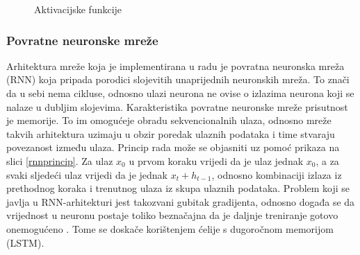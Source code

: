 \documentclass[times, utf8, zavrsni]{fer}
\begin{document}
\begin{figure}
     \centering
     \caption{Aktivacijske funkcije}
     \label{aktivacijske}
\end{figure}

\subsubsection{Povratne neuronske mreže}
Arhitektura mreže koja je implementirana u radu je povratna neuronska mreža (\gls{RNN}) koja pripada porodici slojevitih unaprijednih neuronskih mreža. To znači da u sebi nema cikluse, odnosno ulazi neurona ne ovise o izlazima neurona koji se nalaze u dubljim slojevima. Karakteristika povratne neuronske mreže prisutnost je memorije. To im omogućeje obradu sekvencionalnih ulaza, odnosno mreže takvih arhitektura uzimaju u obzir poredak ulaznih podataka i time stvaraju povezanost između ulaza. Princip rada može se objasniti uz pomoć prikaza na slici \ref{rnnprincip}. Za ulaz $x_0$ u prvom koraku vrijedi da je ulaz jednak $x_0$, a za svaki sljedeći ulaz vrijedi da je jednak $x_{t} + h_{t-1}$, odnosno kombinaciji izlaza iz prethodnog koraka i trenutnog ulaza iz skupa ulaznih podataka. Problem koji se javlja u RNN-arhitekturi jest takozvani gubitak gradijenta, odnosno događa se da vrijednost u neuronu postaje toliko beznačajna da je daljnje treniranje gotovo onemogućeno \citep{rnn_training}. Tome se doskače korištenjem ćelije s dugoročnom memorijom (\gls{LSTM}).
\end{document}
